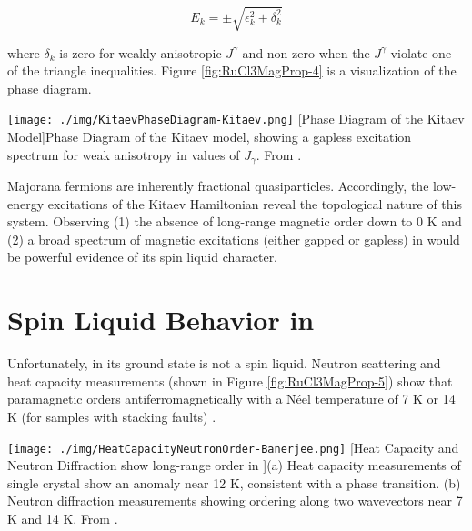 \begin{equation}
E_{k} = \pm \sqrt{\epsilon_{k}^{2} + \delta_{k}^{2}}
\end{equation}

where $\delta_{k}$ is zero for weakly anisotropic $J^{\gamma}$ and non-zero when the $J^{\gamma}$ violate one of the triangle inequalities. Figure \ref{fig:RuCl3MagProp-4} is a visualization of the phase diagram.

\begin{centering}
\texttt{[image: ./img/KitaevPhaseDiagram-Kitaev.png]}
  \captionsetup{width=0.75\textwidth}
  [Phase Diagram of the Kitaev Model]{Phase Diagram of the Kitaev model, showing a gapless excitation spectrum for weak anisotropy in values of $J_{\gamma}$. From \cite{Kitaev2006}.} 
  \label{fig:RuCl3MagProp-4}
\end{centering}

Majorana fermions are inherently fractional quasiparticles. Accordingly, the low-energy excitations of the Kitaev Hamiltonian reveal the topological nature of this system. Observing (1) the absence of long-range magnetic order down to 0 K and (2) a broad spectrum of magnetic excitations (either gapped or gapless) in \rucl would be powerful evidence of its spin liquid character.

\section{Spin Liquid Behavior in \texorpdfstring{\rucl}{RuCl3}}

Unfortunately, \rucl in its ground state is not a spin liquid. Neutron scattering and heat capacity measurements (shown in Figure \ref{fig:RuCl3MagProp-5}) show that paramagnetic \rucl orders antiferromagnetically with a N\'{e}el temperature of 7 K or 14 K (for samples with stacking faults) \cite{Banerjee2016,Sears2015}.

\begin{centering}
\texttt{[image: ./img/HeatCapacityNeutronOrder-Banerjee.png]}
  \captionsetup{width=0.75\textwidth}
  [Heat Capacity and Neutron Diffraction show long-range order in \ruclnospace]{(a) Heat capacity measurements of single crystal \rucl show an anomaly near 12 K, consistent with a phase transition. (b) Neutron diffraction measurements showing ordering along two wavevectors near 7 K and 14 K. From \cite{Banerjee2016}.}
  \label{fig:RuCl3MagProp-5}
\end{centering}


